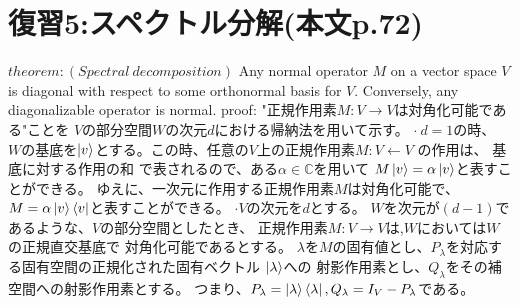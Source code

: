 \section{\Large 復習5:スペクトル分解(本文p.72)}
$theorem :(Spectral~decomposition)$
Any normal operator $M$ on a vector space $V$ is
diagonal with respect to some orthonormal basis for $V$.
Conversely, any diagonalizable operator is normal.
\newline
{\large proof:}
"正規作用素$M:V \rightarrow V$は対角化可能である"ことを
$V$の部分空間$W$の次元$d$における帰納法を用いて示す。
\newline
$\cdot ~d = 1$の時、
$W$の基底を$\ket{v}$とする。この時、任意の$V$上の正規作用素$M:V \leftarrow V$
の作用は、
基底に対する作用の和
で表されるので、ある$\alpha \in \mathbb{C}$を用いて
$M\ket{v} = \alpha \ket{v}$と表すことができる。
ゆえに、一次元に作用する正規作用素$M$は対角化可能で、
$M = \alpha \ket{v}\bra{v}$と表すことができる。
\newline
$\cdot Vの次元をdとする。$
$W$を次元が$(d - 1)$であるような、$V$の部分空間としたとき、
正規作用素$M:V \rightarrow V$は,$W$においては$W$の正規直交基底で
対角化可能であるとする。
$\lambda$を$M$の固有値とし、$P_\lambda$を対応する固有空間の正規化された固有ベクトル
$\ket{\lambda}$への
射影作用素とし、$Q_\lambda$をその補空間への射影作用素とする。
つまり、$P_\lambda = \ket{\lambda} \bra{\lambda}, Q_\lambda = I_V - P_\lambda$である。

